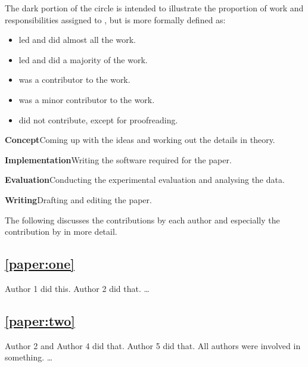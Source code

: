 \noindent
The dark portion of the circle is intended to illustrate the proportion of work and responsibilities assigned to \myName\xspace, but is more formally defined as:
\begin{itemize}
	\item[\cfull] \myName\xspace led and did almost all the work.
	\item[\cthreequarter] \myName\xspace led and did a majority of the work.
	\item[\chalf] \myName\xspace was a contributor to the work.
	\item[\cquarter] \myName\xspace was a minor contributor to the work.
	\item[\cempt] \myName\xspace did not contribute, except for proofreading.
\end{itemize}

\medskip

\noindent\textbf{Concept}\enskip Coming up with the ideas and working out the details in theory.
\smallskip

\noindent\textbf{Implementation}\enskip Writing the software required for the paper.
\smallskip

\noindent\textbf{Evaluation}\enskip Conducting the experimental evaluation and analysing the data.
\smallskip

\noindent\textbf{Writing}\enskip Drafting and editing the paper.


\medskip

\noindent The following discusses the contributions by each author and especially the contribution by \myName\xspace in more detail.


\subsection*{\cref{paper:one}}
Author 1 did this. Author 2 did that. \dots

\subsection*{\cref{paper:two}}
Author 2 and Author 4 did that. Author 5 did that. All authors were involved in something. \dots
